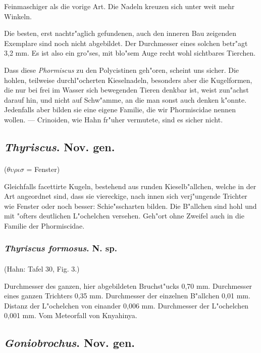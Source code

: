 \documentclass[a4paper, 11pt, oneside]{article}
\begin{document}
Feinmaschiger als die vorige Art. Die Nadeln kreuzen sich unter weit mehr Winkeln.

Die besten, erst nachtr"aglich gefundenen, auch den inneren Bau zeigenden Exemplare sind noch nicht abgebildet. Der Durchmesser eines solchen betr"agt 3,2 mm. Es ist also ein gro"ses, mit blo"sem Auge recht wohl sichtbares Tierchen.

Dass diese \emph{Phormiscus} zu den Polycistinen geh"oren, scheint uns sicher. Die hohlen, teilweise durchl"ocherten Kieselnadeln, besonders aber die Kugelformen, die nur bei frei im Wasser sich bewegenden Tieren denkbar ist, weist zun"achst darauf hin, und nicht auf Schw"amme, an die man sonst auch denken k"onnte. Jedenfalls aber bilden sie eine eigene Familie, die wir Phormiscidae nennen wollen. --- Crinoiden, wie Hahn fr"uher vermutete, sind es sicher nicht.
\subsection{\emph{Thyriscus}. Nov. gen.}
\paragraph{}
($\theta\upsilon\rho\iota\sigma$ = Fenster)%

Gleichfalls facettirte Kugeln, bestehend aus runden Kieselb"allchen, welche in der Art angeordnet sind, dass sie viereckige, nach innen sich verj"ungende Trichter wie Fenster oder noch besser: Schie"sscharten bilden. Die B"allchen sind hohl und mit "ofters deutlichen L"ochelchen versehen. Geh"ort ohne Zweifel auch in die Familie der Phormiscidae.
\subsubsection{\emph{Thyriscus formosus}. N. sp.}
\paragraph{}
(Hahn: Tafel 30, Fig. 3.)

Durchmesser des ganzen, hier abgebildeten Bruchst"ucks 0,70 mm. Durchmesser eines ganzen Trichters 0,35 mm. Durchmesser der einzelnen B"allchen 0,01 mm. Distanz der L"ochelchen von einander 0,006 mm. Durchmesser der L"ochelchen 0,001 mm. Vom Meteorfall von Knyahinya.
\subsection{\emph{Goniobrochus}. Nov. gen.}
\end{document}
